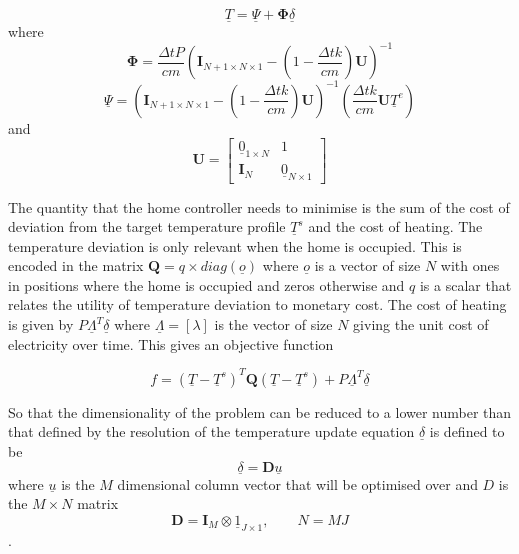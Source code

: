 \documentclass[a4paper, 10 pt, conference]{ieeeconf}  %
\begin{document}
\begin{equation}
\underline{T}=\underline{\Psi}+\boldsymbol{\Phi} \underline{\delta}
\end{equation}
where
\begin{equation}
\boldsymbol{\Phi}= \frac{\Delta t P}{cm} \left( \mathbf{I}_{N+1 \times N \times 1}-(1-\frac{\Delta t k}{cm})\mathbf{U}\right)^{-1}
\end{equation}
\begin{equation}
\underline{\Psi}= \left( \mathbf{I}_{N+1 \times N \times 1}-(1-\frac{\Delta t k}{cm})\mathbf{U}\right)^{-1} \left( \frac{\Delta t k}{cm}\mathbf{U}\underline{T}^{e}\right)
\end{equation}
and
\begin{equation}
\mathbf{U} = \left[
\begin{array}{c|c}
\underline{0}_{1\times N} & 1 \\ \hline
\mathbf{I}_{N} & \underline{0}_{N \times 1}
\end{array}\right]
\end{equation}

The quantity that the home controller needs to minimise is the sum of the cost of deviation from the target temperature profile $\underline{T}^s$ and the cost of heating. The temperature deviation is only relevant when the home is occupied. This is encoded in the matrix $\mathbf{Q}=q \times diag(\underline{o})$ where $\underline{o}$ is a vector of size $N$ with ones in positions where the home is occupied and zeros otherwise and $q$ is a scalar that relates the utility of temperature deviation to monetary cost. The cost of heating is given by $P\underline{\Lambda}^{T} \underline{\delta}$ where $\underline{\Lambda}=[ \lambda ]$ is the vector of size $N$ giving the unit cost of electricity over time. This gives an objective function

\begin{equation}
f = (\underline{T}-\underline{T}^s)^{T}\mathbf{Q}(\underline{T}-\underline{T}^s)+P\underline{\Lambda}^{T} \underline{\delta}
\end{equation}

So that the dimensionality of the problem can be reduced to a lower number than that defined by the resolution of the temperature update equation $\underline{\delta}$ is defined to be
\begin{equation}
\underline{\delta}=\mathbf{D}\underline{u}
\end{equation}
where $\underline{u}$ is the $M$ dimensional column vector that will be optimised over and $D$ is the $M\times N$ matrix
\begin{equation}
\label{quadthermodimension}
\mathbf{D}=\mathbf{I}_{M} \otimes \underline{1}_{J \times 1},\qquad N=MJ
\end{equation}.
\end{document}
